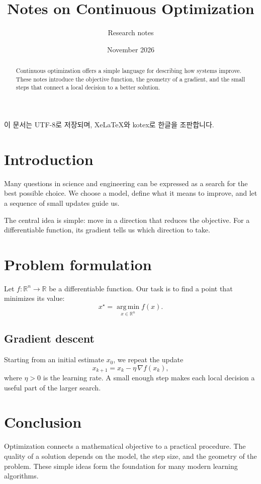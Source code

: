 \documentclass[11pt,a4paper]{article}
\title{Notes on Continuous Optimization}
\author{Research notes}
\date{November 2026}
\begin{document}
\maketitle

\begin{abstract}
Continuous optimization offers a simple language for describing how systems
improve. These notes introduce the objective function, the geometry of a
gradient, and the small steps that connect a local decision to a better
solution.
\end{abstract}

이 문서는 UTF-8로 저장되며, XeLaTeX와 kotex로 한글을 조판합니다.

\section{Introduction}
Many questions in science and engineering can be expressed as a search for
the best possible choice. We choose a model, define what it means to
improve, and let a sequence of small updates guide us.

The central idea is simple: move in a direction that reduces the objective.
For a differentiable function, its gradient tells us which direction to take.

\section{Problem formulation}
Let $f : \mathbb{R}^n \to \mathbb{R}$ be a differentiable function.
Our task is to find a point that minimizes its value:
\begin{equation}
  x^\star = \operatorname*{arg\,min}_{x \in \mathbb{R}^n} f(x).
\end{equation}

\subsection{Gradient descent}
Starting from an initial estimate $x_0$, we repeat the update
\begin{equation}
  x_{k+1} = x_k - \eta\,\nabla f(x_k),
\end{equation}
where $\eta > 0$ is the learning rate. A small enough step makes each
local decision a useful part of the larger search.

\section{Conclusion}
Optimization connects a mathematical objective to a practical procedure.
The quality of a solution depends on the model, the step size, and the
geometry of the problem. These simple ideas form the foundation for
many modern learning algorithms.
\end{document}
